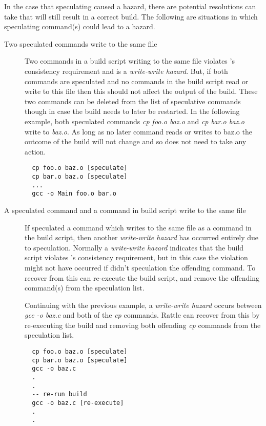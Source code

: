 

In the case that speculating caused a hazard, there are potential resolutions \Rattle can take that will still result in a correct build.  The following are situations in which \Rattle speculating command(s) could lead to a hazard.

\begin{description}
\item [Two speculated commands write to the same file]
  Two commands in a build script writing to the same file violates \Rattle's consistency requirement and is a \emph{write-write hazard}.  But, if both commands are speculated and no commands in the build script read or write to this file then this should not affect the output of the build.  These two commands can be deleted from the list of speculative commands though in case the build needs to later be restarted.  In the following example, both speculated commands \emph{cp foo.o baz.o} and \emph{cp bar.o baz.o} write to \emph{baz.o}.  As long as no later command reads or writes to baz.o the outcome of the build will not change and so \Rattle does not need to take any action.
\begin{verbatim}
  cp foo.o baz.o [speculate]
  cp bar.o baz.o [speculate]
  ...
  gcc -o Main foo.o bar.o
\end{verbatim}

\item [A speculated command and a command in build script write to the same file]
  If \Rattle speculated a command which writes to the same file as a command in the build script, then another \emph{write-write hazard} has occurred entirely due to speculation.  Normally a \emph{write-write hazard} indicates that the build script violates \Rattle's consistency requirement, but in this case the violation might not have occurred if \Rattle didn't speculation the offending command.  To recover from this \Rattle can re-execute the build script, and remove the offending command(s) from the speculation list.

  Continuing with the previous example, a \emph{write-write hazard} occurs between \emph{gcc -o baz.c} and both of the \emph{cp} commands.  Rattle can recover from this by re-executing the build and removing both offending \emph{cp} commands from the speculation list.

\begin{verbatim}
  cp foo.o baz.o [speculate]
  cp bar.o baz.o [speculate]
  gcc -o baz.c
  .
  .
  -- re-run build
  gcc -o baz.c [re-execute]
  .
  .
\end{verbatim}


\end{description}
